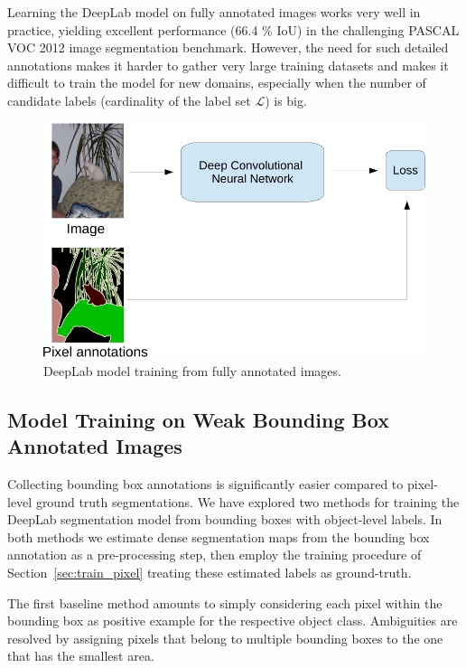 Learning the DeepLab model on fully annotated images works very well
in practice, yielding excellent performance (66.4 \% IoU) in the
challenging PASCAL VOC 2012 image segmentation benchmark. However, the
need for such detailed annotations makes it harder to gather very
large training datasets and makes it difficult to train the model
for new domains, especially when the number of candidate labels
(cardinality of the label set $\mathcal{L}$) is big.

\begin{figure}[htbp!]
  \centering
  \includegraphics[width=0.9\linewidth]{fig/model_train_pixel.pdf} 
  \caption{DeepLab model training from fully annotated images.}
  \label{fig:model_train_pixel}
\end{figure}

\subsection{Model Training on Weak Bounding Box Annotated Images}
\label{sec:train_bbox}

Collecting bounding box annotations is significantly easier compared
to pixel-level ground truth segmentations. We have explored two
methods for training the DeepLab segmentation model from bounding
boxes with object-level labels. In both methods we estimate dense
segmentation maps from the bounding box annotation as a pre-processing
step, then employ the training procedure of
Section~\ref{sec:train_pixel} treating these estimated labels as
ground-truth.

The first baseline method amounts to simply considering each pixel
within the bounding box as positive example for the respective object
class. Ambiguities are resolved by assigning pixels that belong to
multiple bounding boxes to the one that has the smallest area.

